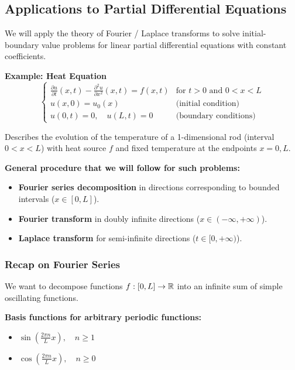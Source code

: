 \newpage

\subsection{Applications to Partial Differential Equations}

We will apply the theory of Fourier / Laplace transforms to solve initial-boundary value problems for linear partial differential equations with constant coefficients.

\textbf{Example: Heat Equation}
\begin{equation}
\begin{cases}
\frac{\partial u}{\partial t}(x,t) - \frac{\partial^2 u}{\partial x^2}(x,t) = f(x,t) & \text{for } t > 0 \text{ and } 0 < x < L \\
u(x,0) = u_0(x) & \text{(initial condition)} \\
u(0,t) = 0, \quad u(L,t) = 0 & \text{(boundary conditions)}
\end{cases}
\end{equation}

Describes the evolution of the temperature of a 1-dimensional rod (interval $0 < x < L$) with heat source $f$ and fixed temperature at the endpoints $x=0, L$.

\textbf{General procedure that we will follow for such problems:}
\begin{itemize}
    \item \textbf{Fourier series decomposition} in directions corresponding to bounded intervals ($x \in [0,L]$).
    \item \textbf{Fourier transform} in doubly infinite directions ($x \in (-\infty,+\infty)$).
    \item \textbf{Laplace transform} for semi-infinite directions ($t \in [0,+\infty)$).
\end{itemize}

\subsubsection{Recap on Fourier Series}

We want to decompose functions $f: [0,L] \rightarrow \mathbb{R}$ into an infinite sum of simple oscillating functions.

\textbf{Basis functions for arbitrary periodic functions:}
\begin{itemize}
    \item $\sin\left(\frac{2\pi n}{L} x\right), \quad n \ge 1$
    \item $\cos\left(\frac{2\pi n}{L} x\right), \quad n \ge 0$
\end{itemize}


